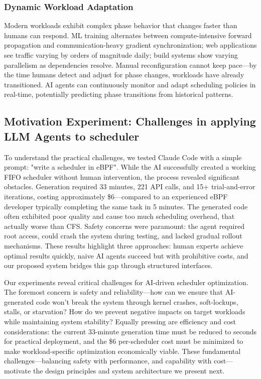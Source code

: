 \subsubsection{Dynamic Workload Adaptation}

Modern workloads exhibit complex phase behavior that changes faster than humans can respond. ML training alternates between compute-intensive forward propagation and communication-heavy gradient synchronization; web applications see traffic varying by orders of magnitude daily; build systems show varying parallelism as dependencies resolve. Manual reconfiguration cannot keep pace—by the time humans detect and adjust for phase changes, workloads have already transitioned. AI agents can continuously monitor and adapt scheduling policies in real-time, potentially predicting phase transitions from historical patterns.

\subsection{Motivation Experiment: Challenges in applying LLM Agents to scheduler}

To understand the practical challenges, we tested Claude Code with a simple prompt: "write a scheduler in eBPF". While the AI successfully created a working FIFO scheduler without human intervention, the process revealed significant obstacles. Generation required 33 minutes, 221 API calls, and 15+ trial-and-error iterations, costing approximately \$6—compared to an experienced eBPF developer typically completing the same task in 5 minutes. The generated code often exhibited poor quality and cause too much scheduling overhead, that actually worse than CFS. Safety concerns were paramount: the agent required root access, could crash the system during testing, and lacked gradual rollout mechanisms. These results highlight three approaches: human experts achieve optimal results quickly, naive AI agents succeed but with prohibitive costs, and our proposed system bridges this gap through structured interfaces.

Our experiments reveal critical challenges for AI-driven scheduler optimization. The foremost concern is safety and reliability—how can we ensure that AI-generated code won't break the system through kernel crashes, soft-lockups, stalls, or starvation? How do we prevent negative impacts on target workloads while maintaining system stability? Equally pressing are efficiency and cost considerations: the current 33-minute generation time must be reduced to seconds for practical deployment, and the \$6 per-scheduler cost must be minimized to make workload-specific optimization economically viable. These fundamental challenges—balancing safety with performance, and capability with cost—motivate the design principles and system architecture we present next.